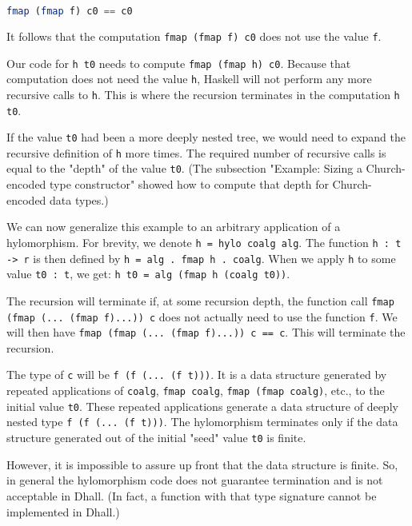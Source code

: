 \begin{lstlisting}[language=Haskell]
fmap (fmap f) c0 == c0
\end{lstlisting}


It follows that the computation \lstinline!fmap (fmap f) c0! does not use the value \lstinline!f!.


Our code for \lstinline!h t0! needs to compute \lstinline!fmap (fmap h) c0!.
Because that computation does not need the value \lstinline!h!, Haskell will not perform any more recursive calls to \lstinline!h!.
This is where the recursion terminates in the computation \lstinline!h t0!.


If the value \lstinline!t0! had been a more deeply nested tree, we would need to expand the recursive definition of \lstinline!h! more times.
The required number of recursive calls is equal to the "depth" of the value \lstinline!t0!.
(The subsection "Example: Sizing a Church-encoded type constructor" showed how to compute that depth for Church-encoded data types.)


We can now generalize this example to an arbitrary application of a hylomorphism.
For brevity, we denote \lstinline!h = hylo coalg alg!.
The function \lstinline!h : t -> r! is then defined by \lstinline!h = alg . fmap h . coalg!.
When we apply \lstinline!h! to some value \lstinline!t0 : t!, we get: \lstinline!h t0 = alg (fmap h (coalg t0))!.


The recursion will terminate if, at some recursion depth, the function call \lstinline!fmap (fmap (... (fmap f)...)) c! does not actually need to use the function \lstinline!f!.
We will then have \lstinline!fmap (fmap (... (fmap f)...)) c == c!.
This will terminate the recursion.


The type of \lstinline!c! will be \lstinline!f (f (... (f t)))!.
It is a data structure generated by repeated applications of \lstinline!coalg!, \lstinline!fmap coalg!, \lstinline!fmap (fmap coalg)!, etc., to the initial value \lstinline!t0!.
These repeated applications generate a data structure of deeply nested type \lstinline!f (f (... (f t)))!.
The hylomorphism terminates only if the data structure generated out of the initial "seed" value \lstinline!t0! is finite. 


However, it is impossible to assure up front that the data structure is finite.
So, in general the hylomorphism code does not guarantee termination and is not acceptable in Dhall.
(In fact, a function with that type signature cannot be implemented in Dhall.)



